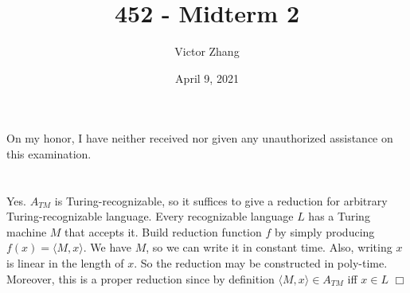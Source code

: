 \documentclass{article}
\title{452 - Midterm 2}
\author{Victor Zhang}
\date{April 9, 2021}
\begin{document}
\maketitle

\section{}
On my honor, I have neither received nor given any unauthorized assistance on this examination.

\section{}
Yes. $A_{TM}$ is Turing-recognizable, so it suffices to give a reduction for arbitrary Turing-recognizable language. Every recognizable language $L$ has a Turing machine $M$ that accepts it. Build reduction function $f$ by simply producing $f(x) = \langle M,x \rangle$. We have $M$, so we can write it in constant time. Also, writing $x$ is linear in the length of $x$. So the reduction may be constructed in poly-time. Moreover, this is a proper reduction since by definition $\langle M,x \rangle \in A_{TM}$ iff $x \in L$ $\Box$
\end{document}
